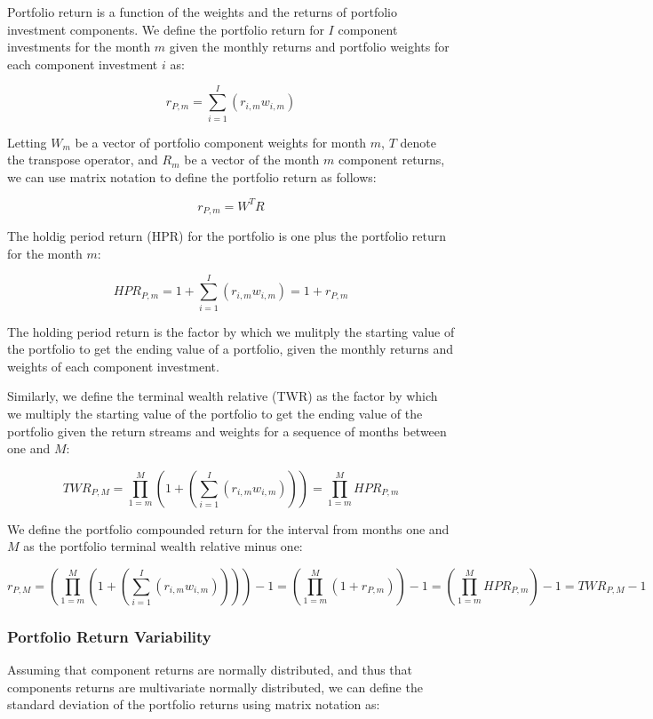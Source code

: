 \documentclass[]{article}
\begin{document}
Portfolio return is a function of the weights and the returns of
portfolio investment components. We define the portfolio return for
\(I\) component investments for the month \(m\) given the monthly
returns and portfolio weights for each component investment \(i\) as:

\[r_{P,m}=\sum_{i=1}^{I}\left(r_{i,m}w_{i,m}\right)\]

Letting \(W_{m}\) be a vector of portfolio component weights for month
\(m\), \(T\) denote the transpose operator, and \(R_{m}\) be a vector of
the month \(m\) component returns, we can use matrix notation to define
the portfolio return as follows:

\[r_{P,m}=W^{T}R\]

The holdig period return (HPR) for the portfolio is one plus the
portfolio return for the month \(m\):

\[HPR_{P,m}=1+\sum_{i=1}^{I}\left(r_{i,m}w_{i,m}\right)=1+r_{P,m}\]

The holding period return is the factor by which we mulitply the
starting value of the portfolio to get the ending value of a portfolio,
given the monthly returns and weights of each component investment.

Similarly, we define the terminal wealth relative (TWR) as the factor by
which we multiply the starting value of the portfolio to get the ending
value of the portfolio given the return streams and weights for a
sequence of months between one and \(M\):

\[TWR_{P,M}=\prod_{1=m}^{M}\left(1+\left(\sum_{i=1}^{I}\left(r_{i,m}w_{i,m}\right)\right)\right)=\prod_{1=m}^{M}HPR_{P,m}\]

We define the portfolio compounded return for the interval from months
one and \(M\) as the portfolio terminal wealth relative minus one:

\[r_{P,M}=\left(\prod_{1=m}^{M}\left(1+\left(\sum_{i=1}^{I}\left(r_{i,m}w_{i,m}\right)\right)\right)\right)-1=\left(\prod_{1=m}^{M}\left(1+r_{P,m}\right)\right)-1=\left(\prod_{1=m}^{M}HPR_{P,m}\right)-1=TWR_{P,M}-1\]

\subsubsection{Portfolio Return
Variability}\label{portfolio-return-variability}

Assuming that component returns are normally distributed, and thus that
components returns are multivariate normally distributed, we can define
the standard deviation of the portfolio returns using matrix notation
as:
\end{document}
